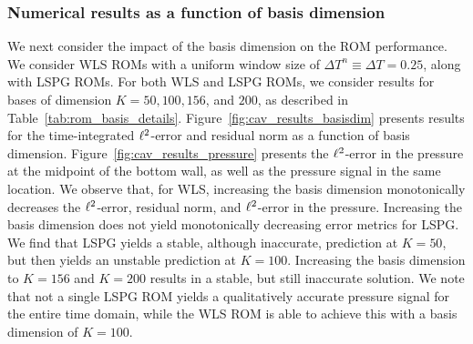 \subsubsection{Numerical results as a function of basis dimension}
We next consider the impact of the basis dimension on the ROM performance. We consider WLS ROMs with a uniform window
size of $\Delta T^n \equiv \Delta T = 0.25$, along with LSPG ROMs. For both WLS and LSPG ROMs, we consider results for bases of 
dimension $K=50,100,156$, and $200$, as described in Table~\ref{tab:rom_basis_details}. Figure~\ref{fig:cav_results_basisdim}
presents results for the time-integrated $\ell^2$-error and residual norm as a function of basis dimension. Figure~\ref{fig:cav_results_pressure} presents the $\ell^2$-error in the pressure at the midpoint of the bottom wall, as well as the pressure signal in the same location. We observe that, for WLS, increasing the basis dimension monotonically decreases the $\ell^2$-error, residual norm, and $\ell^2$-error in the pressure. Increasing the basis dimension does not yield monotonically decreasing error metrics for LSPG. We find that LSPG yields a stable, although inaccurate, prediction at $K=50$, but then yields an unstable prediction at $K=100$. Increasing the basis dimension to $K=156$ and $K=200$ results in a stable, but still inaccurate solution. We note that not a single LSPG ROM yields a qualitatively accurate pressure signal for the entire time domain, while the WLS ROM is able to achieve this with a basis dimension of $K=100$. 
